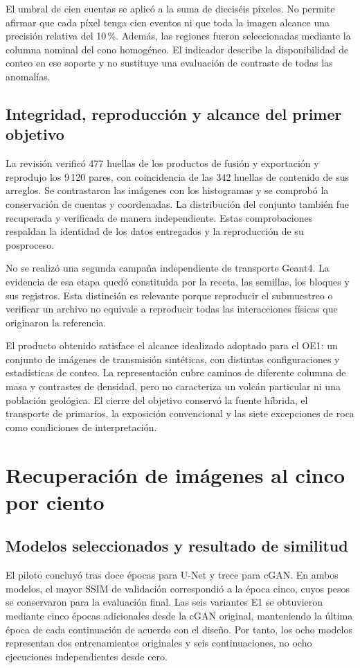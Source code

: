El umbral de cien cuentas se aplicó a la suma de dieciséis píxeles. No permite afirmar que cada píxel tenga cien eventos ni que toda la imagen alcance una precisión relativa del 10\,\%. Además, las regiones fueron seleccionadas mediante la columna nominal del cono homogéneo. El indicador describe la disponibilidad de conteo en ese soporte y no sustituye una evaluación de contraste de todas las anomalías.

\subsection{Integridad, reproducción y alcance del primer objetivo}
La revisión verificó 477 huellas de los productos de fusión y exportación y reprodujo los 9\,120 pares, con coincidencia de las 342 huellas de contenido de sus arreglos. Se contrastaron las imágenes con los histogramas y se comprobó la conservación de cuentas y coordenadas. La distribución del conjunto también fue recuperada y verificada de manera independiente. Estas comprobaciones respaldan la identidad de los datos entregados y la reproducción de su posproceso.

No se realizó una segunda campaña independiente de transporte Geant4. La evidencia de esa etapa quedó constituida por la receta, las semillas, los bloques y sus registros. Esta distinción es relevante porque reproducir el submuestreo o verificar un archivo no equivale a reproducir todas las interacciones físicas que originaron la referencia.

El producto obtenido satisface el alcance idealizado adoptado para el OE1: un conjunto de imágenes de transmisión sintéticas, con distintas configuraciones y estadísticas de conteo. La representación cubre caminos de diferente columna de masa y contrastes de densidad, pero no caracteriza un volcán particular ni una población geológica. El cierre del objetivo conservó la fuente híbrida, el transporte de primarios, la exposición convencional y las siete excepciones de roca como condiciones de interpretación.

\section{Recuperación de imágenes al cinco por ciento}\label{sec:res-oe2}
\subsection{Modelos seleccionados y resultado de similitud}
El piloto concluyó tras doce épocas para U-Net y trece para cGAN. En ambos modelos, el mayor SSIM de validación correspondió a la época cinco, cuyos pesos se conservaron para la evaluación final. Las seis variantes E1 se obtuvieron mediante cinco épocas adicionales desde la cGAN original, manteniendo la última época de cada continuación de acuerdo con el diseño. Por tanto, los ocho modelos representan dos entrenamientos originales y seis continuaciones, no ocho ejecuciones independientes desde cero.

